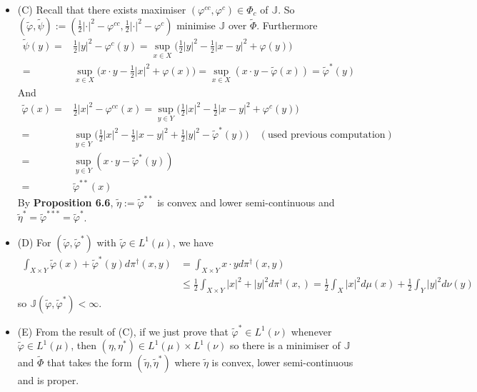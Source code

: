 \documentclass[12pt,a4paper]{article}
\renewenvironment{i}
{\begin{itemize} 
	}%
	{\end{itemize}
}
\begin{document}
\begin{i}
\item[(C)] Recall that there exists maximiser $(\varphi^{cc}, \varphi^c)\in \Phi_c$ of $\mathbb{J}$. So $(\tilde{\varphi}, \tilde{\psi}) := (\frac{1}{2}|\cdot|^2 - \varphi^{cc}, \frac{1}{2}|\cdot|^2 - \varphi^c)$ minimise $\mathbb{J}$ over $\tilde{\Phi}$. Furthermore
\begin{align*}
\tilde{\psi}(y) =& \frac{1}{2}|y|^2 - \varphi^c(y) = \sup_{x\in X} \big( \frac{1}{2} |y|^2 - \frac{1}{2}|x-y|^2 + \varphi(y) \big) \\
=& \sup_{x\in X} \big( x\cdot y -\frac{1}{2} |x|^2 + \varphi(x) \big) = \sup_{x\in X} (x\cdot y - \tilde{\varphi}(x)) = \tilde{\varphi}^*(y)
\end{align*}
And
\begin{align*}
\tilde{\varphi}(x) =& \frac{1}{2} |x|^2 - \varphi^{cc}(x) = \sup_{y\in Y} \big( \frac{1}{2} |x|^2 - \frac{1}{2} |x-y|^2 + \varphi^c (y) \big) \\
=& \sup_{y\in Y}\big( \frac{1}{2}|x|^2 - \frac{1}{2}|x-y|^2 + \frac{1}{2}|y|^2 - \tilde{\varphi}^*(y) \big) \quad (\text{used previous computation}) \\
=& \sup_{y\in Y} (x\cdot y - \tilde{\varphi}^*(y)) \\
=& \tilde{\varphi}^{**}(x)
\end{align*}
By \textbf{Proposition 6.6}, $\tilde{\eta} := \tilde{\varphi}^{**}$ is convex and lower semi-continuous and $\tilde{\eta}^* = \tilde{\varphi}^{***} = \tilde{\varphi}^*$. 
\item[(D)] For $(\tilde{\varphi}, \tilde{\varphi}^*)$ with $\tilde{\varphi} \in L^1(\mu)$, we have
\begin{align*}
\int_{X\times Y} \tilde{\varphi}(x) + \tilde{\varphi}^* (y) d\pi^{\dagger}(x,y) & = \int_{X\times Y} x\cdot y d\pi^{\dagger}(x,y) \\
& \leq \frac{1}{2} \int_{X\times Y} |x|^2 + |y|^2 d\pi^{\dagger} (x,) =\frac{1}{2} \int_X |x|^2 d\mu(x) + \frac{1}{2} \int_Y |y|^2 d\nu(y)
\end{align*}
so $\mathbb{J}(\tilde{\varphi}, \tilde{\varphi}^*) < \infty$.
\item[(E)] From the result of (C), if we just prove that $\tilde{\varphi}^* \in L^1(\nu)$ whenever $\tilde{\varphi} \in L^1(\mu)$, then $(\eta, \eta^*) \in L^1(\mu) \times L^1(\nu)$ so there is a minimiser of $\mathbb{J}$ and $\tilde{\Phi}$ that takes the form $(\tilde{\eta}, \tilde{\eta}^*)$ where $\tilde{\eta}$ is convex, lower semi-continuous and is proper.
\s


\end{i}
\end{document}
